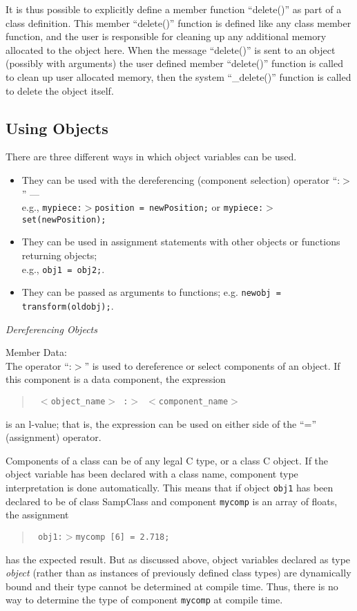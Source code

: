 It is thus possible to explicitly define a member function ``delete()''
as part of a class definition.  This member ``delete()'' function is
defined like any class member function, and the user is responsible for
cleaning up any additional memory allocated to the object here.
When the message ``delete()'' is sent to an object (possibly with
arguments) the user defined member ``delete()'' function is called to
clean up user allocated memory, then the system ``\_delete()'' function is
called to delete the object itself.


\subsection{Using Objects}
There are three different ways in which object variables can be used.
\begin{itemize}
\item
They can be used with the dereferencing (component selection) operator
``:$>$'' ---\\
e.g., {\tt mypiece:$>$position = newPosition;} or
{\tt mypiece:$>$set(newPosition);}
\item
They can be used in assignment statements with other objects or functions
returning objects;\\
e.g., {\tt obj1 = obj2;}.
\item
They can be passed as arguments to functions; e.g.
{\tt newobj = transform(oldobj);}.
\end{itemize}


{\large \flushleft \em Dereferencing Objects}

{\flushleft Member Data:}\\
The operator ``:$>$'' is used to dereference or select components of an
object.  If this component is a data component, the expression
\begin{quote} \tt
$<$object\_name$>$ :$>$ $<$component\_name$>$
\end{quote}
is an l-value;  that is, the expression
can be used on either side of the ``='' (assignment) operator.

Components of a class can be of any legal C type, or a class C object.
If the object variable has been declared with a class name, component type
interpretation is done automatically.  This means that if object
{\tt obj1} has been declared to be of class SampClass and component
{\tt mycomp} is an array of floats, the assignment
\begin{quote} \tt
obj1:$>$mycomp [6] = 2.718;
\end{quote}
has the expected result.
But as discussed above, object variables declared as type
{\em object} (rather than as instances of previously defined class types)
are dynamically bound and
their type cannot be determined at compile time.  Thus, there is no
way to determine the type of component {\tt mycomp} at compile time.

